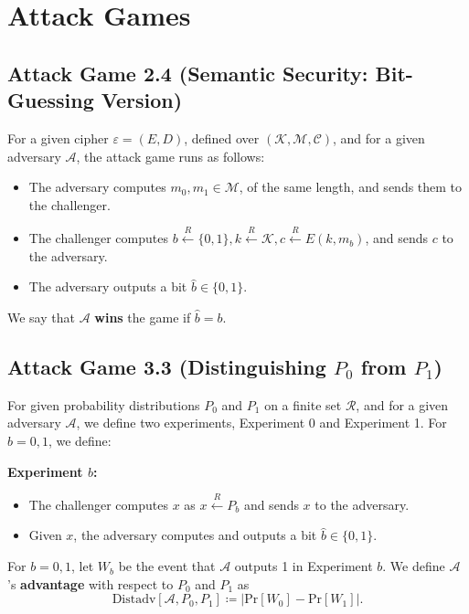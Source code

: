 \appendix
\section{Attack Games} \label{sec:ag}

\subsection{Attack Game 2.4 (Semantic Security: Bit-Guessing Version)} \label{ag:2-4}

For a given cipher $\varepsilon = (E, D)$, defined over $(\mathcal{K}, \mathcal{M}, \mathcal{C})$, and for a given adversary $\mathcal{A}$, the attack game runs as follows:
\begin{itemize}
    \item The adversary computes $m_0, m_1 \in \mathcal{M}$, of the same length, and sends them to the challenger.
    \item The challenger computes $b \overset{R}{\longleftarrow} \{ 0, 1\}, k \overset{R}{\longleftarrow} \mathcal{K}, c \overset{R}{\longleftarrow} E(k, m_b)$, and sends $c$ to the adversary.
    \item The adversary outputs a bit $\hat{b} \in \{0, 1\}$.
\end{itemize}
We say that $\mathcal{A}$ \textbf{wins} the game if $\hat{b} = b$.

\subsection{Attack Game 3.3 (Distinguishing $P_0$ from $P_1$)} \label{ag:3-3}

For given probability distributions $P_0$ and $P_1$ on a finite set $\mathcal{R}$, and for a given adversary $\mathcal{A}$, we define two experiments, Experiment 0 and Experiment 1.
For $b = 0,1$, we define:

\textbf{Experiment $b$:}
\begin{itemize}
    \item The challenger computes $x$ as $x \overset{R}{\longleftarrow} P_b$ and sends $x$ to the adversary.

    \item Given $x$, the adversary computes and outputs a bit $\hat{b} \in \{ 0,1 \}$.
\end{itemize}

For $b = 0,1$, let $W_b$ be the event that $\mathcal{A}$ outputs 1 in Experiment $b$.
We define $\mathcal{A}$'s \textbf{advantage} with respect to $P_0$ and $P_1$ as
\begin{equation*}
    \text{Distadv}[\mathcal{A}, P_0, P_1] \coloneqq \left\vert \text{Pr}[W_0] - \text{Pr}[W_1] \right\vert.
\end{equation*}

